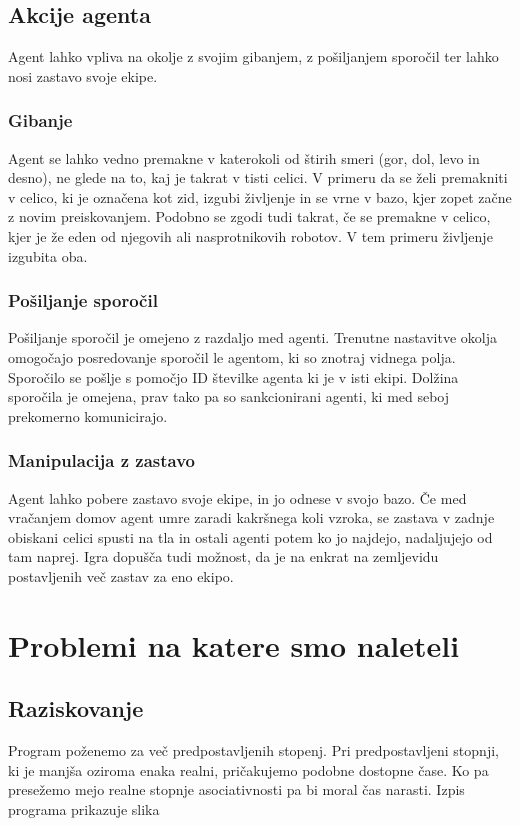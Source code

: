 \documentclass[12pt,a4paper,openany]{book}
\begin{document}
\section{Akcije agenta}
Agent lahko vpliva na okolje z svojim gibanjem, z pošiljanjem sporočil ter lahko nosi zastavo svoje ekipe.

\subsection{Gibanje}
Agent se lahko vedno premakne v katerokoli od štirih smeri (gor, dol, levo in desno), ne glede na to,
kaj je takrat v tisti celici. V primeru da se želi premakniti v celico, ki je označena kot zid, izgubi
življenje in se vrne v bazo, kjer zopet začne z novim preiskovanjem. Podobno se zgodi tudi takrat, če
se premakne v celico, kjer je že eden od njegovih ali nasprotnikovih robotov. V tem primeru življenje izgubita oba.

\subsection{Pošiljanje sporočil}
Pošiljanje sporočil je omejeno z razdaljo med agenti. Trenutne nastavitve okolja omogočajo posredovanje sporočil
 le agentom, ki so znotraj vidnega polja. Sporočilo se pošlje s pomočjo ID številke agenta ki je v isti ekipi.
 Dolžina sporočila je omejena, prav tako pa so sankcionirani agenti, ki med seboj prekomerno komunicirajo.

\subsection{Manipulacija z zastavo}
Agent lahko pobere zastavo svoje ekipe, in jo odnese v svojo bazo. Če med vračanjem domov agent umre zaradi
kakršnega koli vzroka, se zastava v zadnje obiskani celici spusti na tla in ostali agenti potem ko jo najdejo,
nadaljujejo od tam naprej. Igra dopušča tudi možnost, da je na enkrat na zemljevidu postavljenih več zastav za eno ekipo.



\chapter{Problemi na katere smo naleteli}

\section{Raziskovanje}
Program poženemo za več predpostavljenih stopenj. Pri predpostavljeni stopnji, ki je manjša oziroma enaka realni, pričakujemo podobne
dostopne čase. Ko pa presežemo mejo realne stopnje asociativnosti pa bi moral čas narasti. Izpis programa prikazuje slika 
\end{document}
